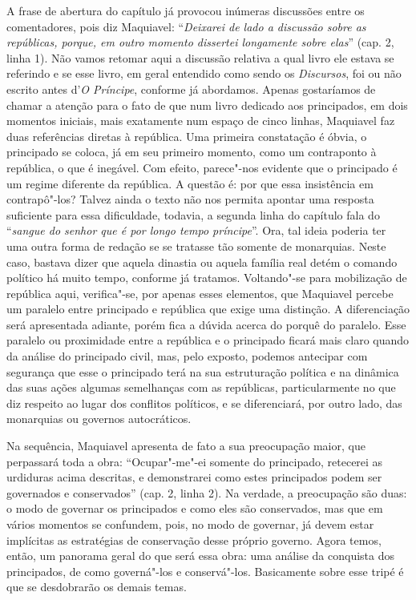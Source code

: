 A frase de abertura do capítulo  já provocou inúmeras discussões entre
os comentadores, pois diz Maquiavel: ``\emph{Deixarei de lado a
discussão sobre as repúblicas, porque, em outro momento dissertei
longamente sobre elas}'' (cap. 2, linha 1). Não vamos retomar aqui a
discussão relativa a qual livro ele estava se referindo e se esse livro,
em geral entendido como sendo os \emph{Discursos}, foi ou não escrito
antes d'\emph{O Príncipe}, conforme já abordamos. Apenas gostaríamos de
chamar a atenção para o fato de que num livro dedicado aos principados,
em dois momentos iniciais, mais exatamente num espaço de cinco linhas,
Maquiavel faz duas referências diretas à república. Uma primeira
constatação é óbvia, o principado se coloca, já em seu primeiro momento,
como um contraponto à república, o que é inegável. Com efeito,
parece"-nos evidente que o principado é um regime diferente da república.
A questão é: por que essa insistência em contrapô"-los? Talvez ainda o
texto não nos permita apontar uma resposta suficiente para essa
dificuldade, todavia, a segunda linha do capítulo fala do ``\emph{sangue
do senhor que é por longo tempo príncipe}''. Ora, tal ideia poderia ter
uma outra forma de redação se se tratasse tão somente de monarquias.
Neste caso, bastava dizer que aquela dinastia ou aquela família real
detém o comando político há muito tempo, conforme já tratamos.
Voltando"-se para mobilização de república aqui, verifica"-se, por apenas
esses elementos, que Maquiavel percebe um paralelo entre principado e
república que exige uma distinção. A diferenciação será apresentada
adiante, porém fica a dúvida acerca do porquê do paralelo. Esse paralelo
ou proximidade entre a república e o principado ficará mais claro quando
da análise do principado civil, mas, pelo exposto, podemos antecipar com
segurança que esse o principado terá na sua estruturação política e na
dinâmica das suas ações algumas semelhanças com as repúblicas,
particularmente no que diz respeito ao lugar dos conflitos políticos, e
se diferenciará, por outro lado, das monarquias ou governos
autocráticos.

Na sequência, Maquiavel apresenta de fato a sua preocupação maior, que
perpassará toda a obra: ``Ocupar"-me"-ei somente do principado, retecerei
as urdiduras acima descritas, e demonstrarei como estes principados
podem ser governados e conservados'' (cap. 2, linha 2). Na verdade, a
preocupação são duas: o modo de governar os principados e como eles são
conservados, mas que em vários momentos se confundem, pois, no modo de
governar, já devem estar implícitas as estratégias de conservação desse
próprio governo. Agora temos, então, um panorama geral do que será essa
obra: uma análise da conquista dos principados, de como governá"-los e
conservá"-los. Basicamente sobre esse tripé é que se desdobrarão os
demais temas.

